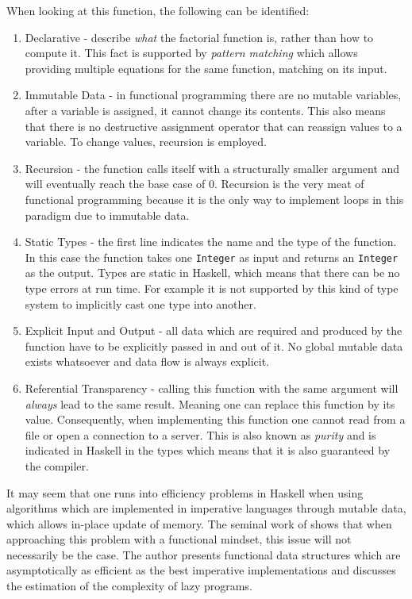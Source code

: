 When looking at this function, the following can be identified: 
\begin{enumerate}
	\item Declarative - describe \textit{what} the factorial function is, rather than how to compute it. This fact is supported by \textit{pattern matching} which allows providing multiple equations for the same function, matching on its input. 
	
	\item Immutable Data - in functional programming there are no mutable variables, after a variable is assigned, it cannot change its contents. This also means that there is no destructive assignment operator that can reassign values to a variable. To change values, recursion is employed.

	\item Recursion - the function calls itself with a structurally smaller argument and will eventually reach the base case of 0. Recursion is the very meat of functional programming because it is the only way to implement loops in this paradigm due to immutable data.
	
	\item Static Types - the first line indicates the name and the type of the function. In this case the function takes one \texttt{Integer} as input and returns an \texttt{Integer} as the output. Types are static in Haskell, which means that there can be no type errors at run time. For example it is not supported by this kind of type system to implicitly cast one type into another.

	\item Explicit Input and Output - all data which are required and produced by the function have to be explicitly passed in and out of it. No global mutable data exists whatsoever and data flow is always explicit.
	
	\item Referential Transparency - calling this function with the same argument will \textit{always} lead to the same result. Meaning one can replace this function by its value. Consequently, when implementing this function one cannot read from a file or open a connection to a server. This is also known as \textit{purity} and is indicated in Haskell in the types which means that it is also guaranteed by the compiler.
\end{enumerate}

It may seem that one runs into efficiency problems in Haskell when using algorithms which are implemented in imperative languages through mutable data, which allows in-place update of memory. The seminal work of \cite{okasaki_purely_1999} shows that when approaching this problem with a functional mindset, this issue will not necessarily be the case. The author presents functional data structures which are asymptotically as efficient as the best imperative implementations and discusses the estimation of the complexity of lazy programs.

